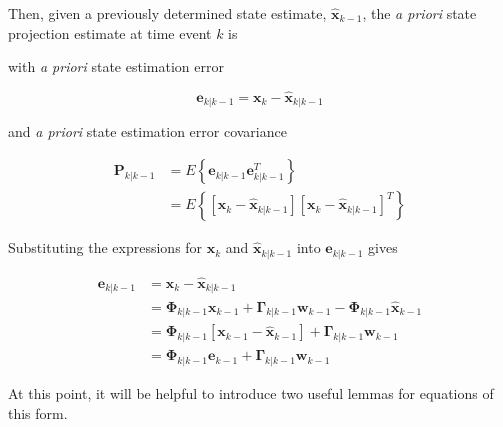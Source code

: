 Then, given a previously determined state estimate, $\hat{\mathbf{x}}_{k-1}$, the
\textit{a priori} state projection estimate at time event $k$ is


with \textit{a priori} state estimation error

\begin{equation*}
    \mathbf{e}_{k|k-1} = \mathbf{x}_{k} - \hat{\mathbf{x}}_{k|k-1}
\end{equation*}

and \textit{a priori} state estimation error covariance

\begin{equation*}
    \begin{aligned}
        \mathbf{P}_{k|k-1} &= E \left\{ \mathbf{e}_{k|k-1} \mathbf{e}_{k|k-1}^T \right\} \\
        &= E \left\{ \left[ \mathbf{x}_{k} - \hat{\mathbf{x}}_{k|k-1} \right] \left[ \mathbf{x}_{k} - \hat{\mathbf{x}}_{k|k-1} \right]^T \right\}
    \end{aligned}
\end{equation*}

Substituting the expressions for $\mathbf{x}_k$ and $\hat{\mathbf{x}}_{k|k-1}$ into
$\mathbf{e}_{k|k-1}$ gives

\begin{equation*}
    \begin{aligned}
        \mathbf{e}_{k|k-1} &= \mathbf{x}_{k} - \hat{\mathbf{x}}_{k|k-1} \\
        &= \mathbf{\Phi}_{k|k-1} \mathbf{x}_{k-1} + \mathbf{\Gamma}_{k|k-1} \mathbf{w}_{k-1} - \mathbf{\Phi}_{k|k-1} \hat{\mathbf{x}}_{k-1} \\
        &= \mathbf{\Phi}_{k|k-1} \left[ \mathbf{x}_{k-1} - \hat{\mathbf{x}}_{k-1} \right] + \mathbf{\Gamma}_{k|k-1} \mathbf{w}_{k-1} \\
        &= \mathbf{\Phi}_{k|k-1} \mathbf{e}_{k-1} + \mathbf{\Gamma}_{k|k-1} \mathbf{w}_{k-1}
    \end{aligned}
\end{equation*}

At this point, it will be helpful to introduce two useful lemmas for equations of this
form.

